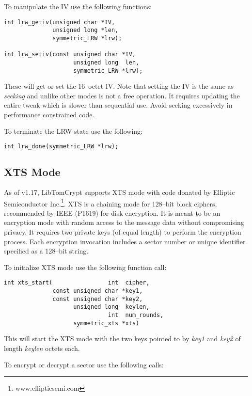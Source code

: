 \documentclass[synpaper]{book}
\begin{document}
To manipulate the IV use the following functions:

  
\begin{verbatim}
int lrw_getiv(unsigned char *IV, 
              unsigned long *len, 
              symmetric_LRW *lrw);

int lrw_setiv(const unsigned char *IV, 
                    unsigned long  len, 
                    symmetric_LRW *lrw);
\end{verbatim}
These will get or set the 16--octet IV.  Note that setting the IV is the same as \textit{seeking} and unlike other modes is not a free operation.  It requires
updating the entire tweak which is slower than sequential use.  Avoid seeking excessively in performance constrained code.

To terminate the LRW state use the following:

\begin{verbatim}
int lrw_done(symmetric_LRW *lrw);
\end{verbatim}

\subsection{XTS Mode}
As of v1.17, LibTomCrypt supports XTS mode with code donated by Elliptic Semiconductor Inc.\footnote{www.ellipticsemi.com}.  
XTS is a chaining mode for 128--bit block ciphers, recommended by IEEE (P1619) 
for disk encryption.  It is meant to be an encryption mode with random access to the message data without compromising privacy.  It requires two private keys (of equal 
length) to perform the encryption process.  Each encryption invocation includes a sector number or unique identifier specified as a 128--bit string.  

To initialize XTS mode use the following function call:

\begin{verbatim}
int xts_start(                int  cipher,
              const unsigned char *key1, 
              const unsigned char *key2, 
                    unsigned long  keylen,
                              int  num_rounds, 
                    symmetric_xts *xts)
\end{verbatim}
This will start the XTS mode with the two keys pointed to by \textit{key1} and \textit{key2} of length \textit{keylen} octets each.  

To encrypt or decrypt a sector use the following calls:
\end{document}
